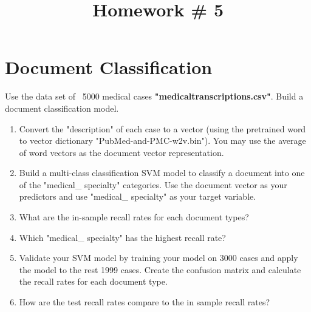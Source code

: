 \documentclass{article}
\title{Homework \# 5} %
\begin{document}
\maketitle %
\thispagestyle{fancy}
\pagestyle{fancy}%


\section{Document Classification} %
Use the  data set of ~5000 medical cases \textbf{"medicaltranscriptions.csv"}. Build a document classification model.

\begin{enumerate}[(1)]

\item Convert the "description" of each case to a vector (using the pretrained word to vector dictionary "PubMed-and-PMC-w2v.bin"). You may use the average of word vectors as the document vector representation.
\item Build a multi-class classification SVM model to classify a document into one of the "medical\_ specialty" categories.  Use the document vector as your predictors and use "medical\_ specialty" as your target variable. 
\item What are the in-sample recall rates for each document types?
\item Which "medical\_ specialty" has the highest recall rate?
\item Validate your SVM model by training your model on 3000 cases and apply the model to the rest 1999 cases. Create the confusion matrix and  calculate the recall rates for each document type.
\item How are the test recall rates compare to the in sample recall rates?

\end{enumerate}
\end{document}
